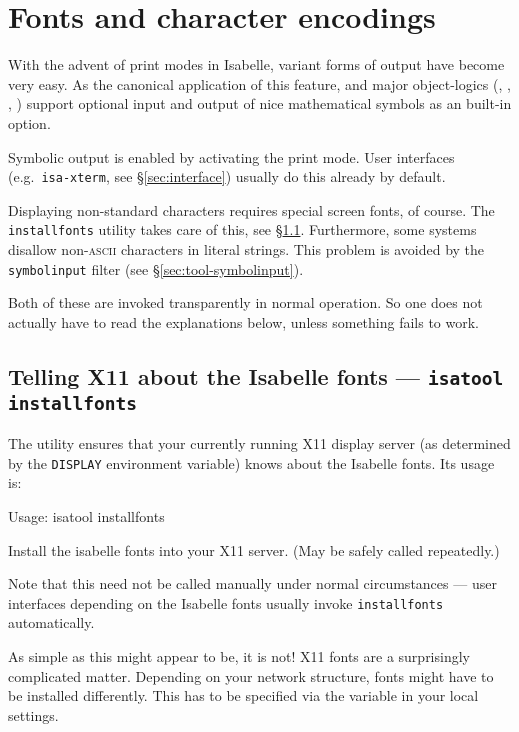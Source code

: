 
\chapter{Fonts and character encodings}

With the advent of print modes in Isabelle, variant forms of output
have become very easy. As the canonical application of this feature,
{\Pure} and major object-logics (\FOL, \ZF, \HOL, \HOLCF) support
optional input and output of nice mathematical symbols as an built-in
option.

Symbolic output is enabled by activating the  print
mode. User interfaces (e.g.\ \texttt{isa-xterm}, see
\S\ref{sec:interface}) usually do this already by default.

\medskip Displaying non-standard characters requires special screen
fonts, of course. The \texttt{installfonts} utility takes care of
this, see \S\ref{sec:tool-installfonts}. Furthermore, some {\ML}
systems disallow non-\textsc{ascii} characters in literal strings.
This problem is avoided by the \texttt{symbolinput} filter (see
\S\ref{sec:tool-symbolinput}).

Both of these are invoked transparently in normal operation. So one
does not actually have to read the explanations below, unless
something fails to work.


\section{Telling X11 about the Isabelle fonts --- \texttt{isatool installfonts}}
\label{sec:tool-installfonts}

The  utility ensures that your currently running
X11 display server (as determined by the \texttt{DISPLAY} environment
variable) knows about the Isabelle fonts. Its usage is:
\begin{ttbox}
Usage: isatool installfonts

  Install the isabelle fonts into your X11 server.
  (May be safely called repeatedly.)
\end{ttbox}
Note that this need not be called manually under normal circumstances
--- user interfaces depending on the Isabelle fonts usually invoke
\texttt{installfonts} automatically.

\medskip As simple as this might appear to be, it is not! X11 fonts
are a surprisingly complicated matter. Depending on your network
structure, fonts might have to be installed differently. This has to
be specified via the  variable in your
local settings.

